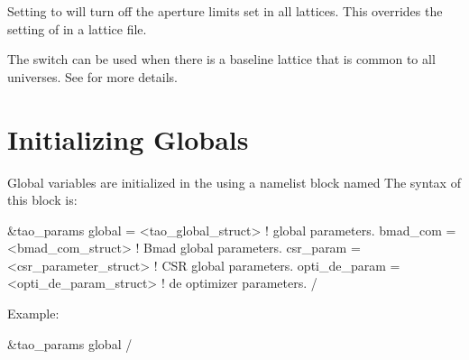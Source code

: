 {{{Setting  to  will turn off the
aperture limits set in all lattices. This overrides the setting of
 in a lattice file.

The  switch can be used when there is a baseline
lattice that is common to all universes. See  for more
details.

\section{Initializing Globals}
\label{s:globals} 

Global variables are initialized in the  using a
namelist block named  The syntax of this block is:
\begin{example}
  &tao_params
    global        = <tao_global_struct>     ! global parameters.
    bmad_com      = <bmad_com_struct>       ! Bmad global parameters.
    csr_param     = <csr_parameter_struct>  ! CSR global parameters.
    opti_de_param = <opti_de_param_struct>  ! de optimizer parameters.
  /
\end{example}
Example:
\begin{example}
  &tao_params
    global%
  /
\end{example}

}}}
